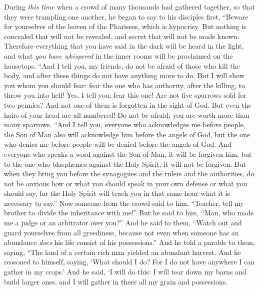 \begin{biblechapter} %
 During \textit{this time} when a crowd of many thousands had gathered together, so that they were trampling one another, he began to say to his disciples first, “Beware for yourselves of the leaven of the Pharisees, which is hypocrisy.
\verse But nothing is concealed that will not be revealed, and secret that will not be made known.
\verse Therefore everything that you have said in the dark will be heard in the light, and what \textit{you have whispered} in the inner rooms will be proclaimed on the housetops.
 “And I tell you, my friends, do not be afraid of those who kill the body, and after these things do not have anything more to do.
\verse But I will show you whom you should fear: fear the one who has authority, after the killing, to throw you into hell! Yes, I tell you, fear this one!
\verse Are not five sparrows sold for two pennies? And not one of them is forgotten in the sight of God.
\verse But even the hairs of your head are all numbered! Do not be afraid; you are worth more than many sparrows.
 “And I tell you, everyone who acknowledges me before people, the Son of Man also will acknowledge him before the angels of God,
\verse but the one who denies me before people will be denied before the angels of God.
\verse And everyone who speaks a word against the Son of Man, it will be forgiven him, but to the one who blasphemes against the Holy Spirit, it will not be forgiven.
\verse But when they bring you before the synagogues and the rulers and the authorities, do not be anxious how or what you should speak in your own defense or what you should say,
\verse for the Holy Spirit will teach you in that same hour what it is necessary to say.”
 Now someone from the crowd said to him, “Teacher, tell my brother to divide the inheritance with me!”
\verse But he said to him, “Man, who made me a judge or an arbitrator over you?”
\verse And he said to them, “Watch out and guard yourselves from all greediness, because not even when someone has an abundance \textit{does} his life consist of his possessions.”
\verse And he told a parable to them, saying, “The land of a certain rich man yielded an abundant harvest.
\verse And he reasoned to himself, saying, ‘What should I do? For I do not have anywhere I can gather in my crops.’
\verse And he said, ‘I will do this: I will tear down my barns and build larger ones, and I will gather in there all my grain and possessions.

\end{biblechapter}

